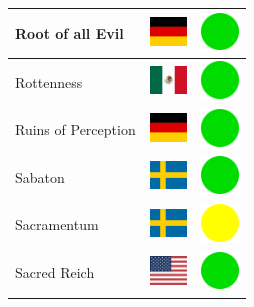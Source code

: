 \documentclass[12pt, a4paper, twoside]{report}
\begin{document}
\begin{center}
\begin{longtable}{|p{5cm}|p{2cm}|p{2cm}|}
 Root of all Evil                                           & \includegraphics[width=1cm]{../4x3/de} &   \includegraphics[width=1cm]{../likes/y} \\ \hline
 Rottenness                                                 & \includegraphics[width=1cm]{../4x3/mx} &   \includegraphics[width=1cm]{../likes/y} \\ \hline
 Ruins of Perception                                        & \includegraphics[width=1cm]{../4x3/de} &   \includegraphics[width=1cm]{../likes/y} \\ \hline
 Sabaton                                                    & \includegraphics[width=1cm]{../4x3/se} &   \includegraphics[width=1cm]{../likes/y} \\ \hline
 Sacramentum﻿                                                & \includegraphics[width=1cm]{../4x3/se} &   \includegraphics[width=1cm]{../likes/m} \\ \hline
 Sacred Reich                                               & \includegraphics[width=1cm]{../4x3/us} &   \includegraphics[width=1cm]{../likes/y} \\ \hline

\end{longtable}
\end{center}
\end{document}
